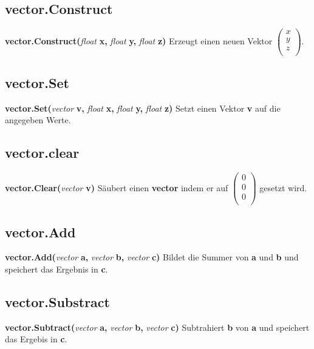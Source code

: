 \documentclass[11pt,a4paper]{book}
\begin{document}
\subsection{vector.Construct}
\label{vect-cons}
\textbf{vector.Construct(}\textit{float}\textbf{ x, }\textit{float}\textbf{ y, }\textit{float}\textbf{ z)}
\newline
Erzeugt einen neuen Vektor \begin{math}\left(\begin{array}{c} x \\ y \\ z \\  \end{array}\right)\end{math}.
\subsection{vector.Set}
\label{vect-set}
\textbf{vector.Set(}\textit{vector}\textbf{ v, }\textit{float}\textbf{ x, }\textit{float}\textbf{ y, }\textit{float}\textbf{ z)}
\newline
Setzt einen Vektor \textbf{v} auf die angegeben Werte.
\subsection{vector.clear}
\label{vect-clear}
\textbf{vector.Clear(}\textit{vector}\textbf{ v)}
\newline
Säubert einen \textbf{vector} indem er auf \begin{math}\left(\begin{array}{c} 0 \\ 0 \\ 0 \\ \end{array}\right)\end{math} gesetzt wird.
\subsection{vector.Add}
\label{vect-add}
\textbf{vector.Add(}\textit{vector}\textbf{ a, }\textit{vector}\textbf{ b, }\textit{vector}\textbf{ c)}
\newline
Bildet die Summer von \textbf{a} und \textbf{b} und speichert das Ergebnis in \textbf{c}.
\subsection{vector.Substract}
\label{vect-sub}
\textbf{vector.Subtract(}\textit{vector}\textbf{ a, }\textit{vector}\textbf{ b, }\textit{vector}\textbf{ c)}
\newline
Subtrahiert \textbf{b} von \textbf{a} und speichert das Ergebis in \textbf{c}.
\end{document}

